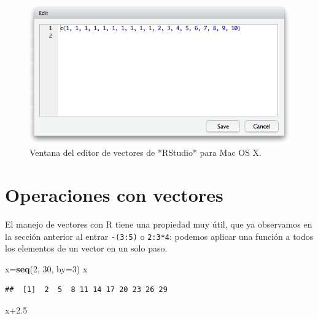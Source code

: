 \documentclass[]{book}
\newenvironment{Shaded}{\begin{snugshade}}{\end{snugshade}}
\newcommand{\DataTypeTok}[1]{\textcolor[rgb]{0.13,0.29,0.53}{#1}}
\newcommand{\DecValTok}[1]{\textcolor[rgb]{0.00,0.00,0.81}{#1}}
\newcommand{\FloatTok}[1]{\textcolor[rgb]{0.00,0.00,0.81}{#1}}
\newcommand{\KeywordTok}[1]{\textcolor[rgb]{0.13,0.29,0.53}{\textbf{#1}}}
\newcommand{\NormalTok}[1]{#1}
\theoremstyle{definition}
\theoremstyle{definition}
\theoremstyle{definition}
\theoremstyle{remark}
\begin{document}
\begin{figure}

{\centering \includegraphics{AprendeR-Parte-I_files/figure-html/finestres0} 

}

\caption{Ventana del editor de vectores de *RStudio* para Mac OS X.}\label{fig:editvect}
\end{figure}

\hypertarget{operaciones-con-vectores}{%
\section{Operaciones con vectores}\label{operaciones-con-vectores}}

El manejo de vectores con R tiene una propiedad muy útil, que ya observamos en la sección anterior al entrar \texttt{-(3:5)} o \texttt{2:3*4}: podemos aplicar una función a todos los elementos de un vector en un solo paso.

\begin{Shaded}
\begin{Highlighting}[]
\NormalTok{x=}\KeywordTok{seq}\NormalTok{(}\DecValTok{2}\NormalTok{, }\DecValTok{30}\NormalTok{, }\DataTypeTok{by=}\DecValTok{3}\NormalTok{)}
\NormalTok{x}
\end{Highlighting}
\end{Shaded}

\begin{verbatim}
##  [1]  2  5  8 11 14 17 20 23 26 29
\end{verbatim}

\begin{Shaded}
\begin{Highlighting}[]
\NormalTok{x}\FloatTok{+2.5}
\end{Highlighting}
\end{Shaded}
\end{document}

